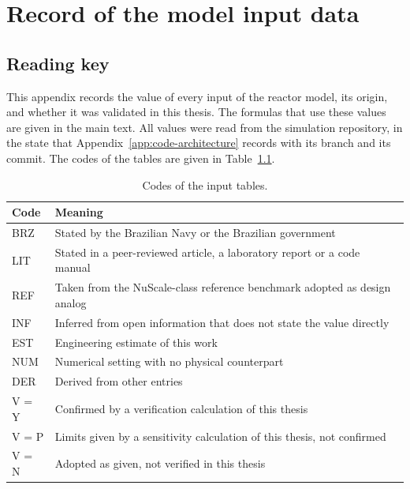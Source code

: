 
\chapter{Record of the model input data}
\label{app:model-inputs}
\label{app:labgene-data}

\section{Reading key}
\label{app:inputs-purpose}

This appendix records the value of every input of the reactor model,
its origin, and whether it was validated in this thesis. The formulas
that use these values are given in the main text. All values were read
from the simulation repository, in the state that
Appendix~\ref{app:code-architecture} records with its branch and its
commit. The codes of the tables are given
in Table~\ref{tab:in-key}.

\begin{table}[htbp]
  \centering
  \small
  \caption{Codes of the input tables.}
  \label{tab:in-key}
  \begin{tabularx}{\textwidth}{@{}l>{\raggedright\arraybackslash}X@{}}
    \toprule
    Code & Meaning \\
    \midrule
    BRZ & Stated by the Brazilian Navy or the Brazilian government \\
    LIT & Stated in a peer-reviewed article, a laboratory report or a code manual \\
    REF & Taken from the NuScale-class reference benchmark adopted as design analog \\
    INF & Inferred from open information that does not state the value directly \\
    EST & Engineering estimate of this work \\
    NUM & Numerical setting with no physical counterpart \\
    DER & Derived from other entries \\
    \midrule
    V = Y & Confirmed by a verification calculation of this thesis \\
    V = P & Limits given by a sensitivity calculation of this thesis, not confirmed \\
    V = N & Adopted as given, not verified in this thesis \\
    \bottomrule
  \end{tabularx}
\end{table}


